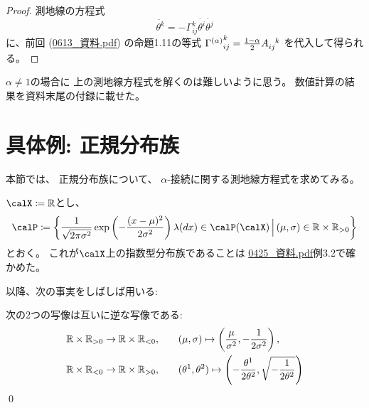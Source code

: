 \documentclass[report]{jlreq}
\begin{document}
\begin{proof}
    測地線の方程式
    \begin{equation}
        \ddot{\theta^k}
            = - \Gamma_{ij}^k \dot{\theta^i} \dot{\theta^j}
    \end{equation}
    に、前回 (\url{0613_資料.pdf}) の命題1.11の等式
    ${\Gamma^{(\alpha)}}_{ij}^k = \frac{1 - \alpha}{2} A_{ij}^{\hphantom{ij}k}$
    を代入して得られる。
\end{proof}

$\alpha \neq 1$の場合に
上の測地線方程式を解くのは難しいように思う。
数値計算の結果を資料末尾の付録に載せた。


%
\section{具体例: 正規分布族}

本節では、
正規分布族について、
$\alpha$-接続に関する測地線方程式を求めてみる。

\begin{settings}[正規分布族]
    $\calX \coloneqq \R$とし、
    \begin{equation}
        \calP \coloneqq \mybrace{
            \frac{1}{\sqrt{2 \pi \sigma^2}}
            \exp\myparen{
                - \frac{(x - \mu)^2}{2 \sigma^2}
            }
            \lambda(dx)
            \in \calP(\calX)
            \, \Big| \,
            (\mu, \sigma) \in \R \times \R_{> 0}
        }
    \end{equation}
    とおく。
    これが$\calX$上の指数型分布族であることは
    \url{0425_資料.pdf}例3.2で確かめた。
\end{settings}

以降、次の事実をしばしば用いる:

\begin{fact}
    次の2つの写像は互いに逆な{\smooth}写像である:
    \begin{alignat}{1}
        \mathbb{R} \times \mathbb{R}_{> 0} \to \mathbb{R} \times \mathbb{R}_{< 0},
            \qquad
            &(\mu, \sigma)
            \mapsto
            \left({
                \frac{\mu}{\sigma^2},
                - \frac{1}{2\sigma^2}
            }\right),
            \\
        \mathbb{R} \times \mathbb{R}_{< 0} \to \mathbb{R} \times \mathbb{R}_{> 0},
            \qquad
            &(\theta^1, \theta^2)
            \mapsto
            \left({
                - \frac{\theta^1}{2\theta^2},
                \sqrt{- \frac{1}{2\theta^2}}
            }\right)
    \end{alignat}
    \qed
\end{fact}
\end{document}
